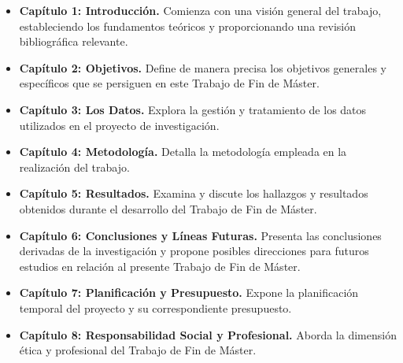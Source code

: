 \begin{itemize}
    \item \textbf{Capítulo 1: Introducción.} Comienza con una visión general del trabajo, estableciendo los fundamentos teóricos y proporcionando una revisión bibliográfica relevante.
    \item \textbf{Capítulo 2: Objetivos.} Define de manera precisa los objetivos generales y específicos que se persiguen en este Trabajo de Fin de Máster.
    \item \textbf{Capítulo 3: Los Datos.} Explora la gestión y tratamiento de los datos utilizados en el proyecto de investigación.
    \item \textbf{Capítulo 4: Metodología.} Detalla la metodología empleada en la realización del trabajo.
    \item \textbf{Capítulo 5: Resultados.} Examina y discute los hallazgos y resultados obtenidos durante el desarrollo del Trabajo de Fin de Máster.
    \item \textbf{Capítulo 6: Conclusiones y Líneas Futuras.} Presenta las conclusiones derivadas de la investigación y propone posibles direcciones para futuros estudios en relación al presente Trabajo de Fin de Máster.
    \item \textbf{Capítulo 7: Planificación y Presupuesto.} Expone la planificación temporal del proyecto y su correspondiente presupuesto.
    \item \textbf{Capítulo 8: Responsabilidad Social y Profesional.} Aborda la dimensión ética y profesional del Trabajo de Fin de Máster.
    \end{itemize}












